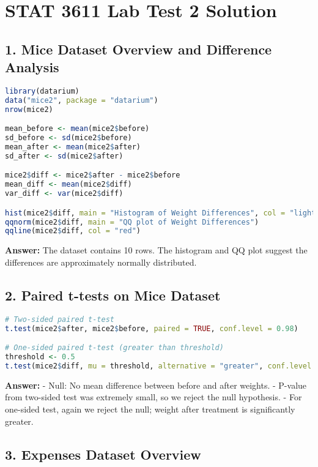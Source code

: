 \documentclass{article}
\begin{document}
\section*{STAT 3611 Lab Test 2 Solution}

\subsection*{1. Mice Dataset Overview and Difference Analysis}

\begin{lstlisting}[language=R]
library(datarium)
data("mice2", package = "datarium")
nrow(mice2)

mean_before <- mean(mice2$before)
sd_before <- sd(mice2$before)
mean_after <- mean(mice2$after)
sd_after <- sd(mice2$after)

mice2$diff <- mice2$after - mice2$before
mean_diff <- mean(mice2$diff)
var_diff <- var(mice2$diff)

hist(mice2$diff, main = "Histogram of Weight Differences", col = "lightblue")
qqnorm(mice2$diff, main = "QQ plot of Weight Differences")
qqline(mice2$diff, col = "red")
\end{lstlisting}

\textbf{Answer:} The dataset contains 10 rows. The histogram and QQ plot suggest the differences are approximately normally distributed.

\subsection*{2. Paired t-tests on Mice Dataset}

\begin{lstlisting}[language=R]
# Two-sided paired t-test
t.test(mice2$after, mice2$before, paired = TRUE, conf.level = 0.98)

# One-sided paired t-test (greater than threshold)
threshold <- 0.5
t.test(mice2$diff, mu = threshold, alternative = "greater", conf.level = 0.98)
\end{lstlisting}

\textbf{Answer:}  
- Null: No mean difference between before and after weights.  
- P-value from two-sided test was extremely small, so we reject the null hypothesis.  
- For one-sided test, again we reject the null; weight after treatment is significantly greater.

\subsection*{3. Expenses Dataset Overview}
\end{document}
